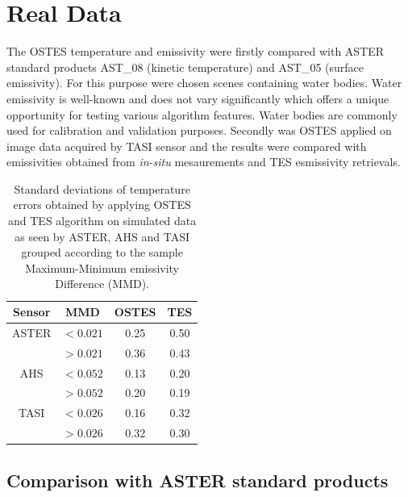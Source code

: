 \section{Real Data}

The OSTES temperature and emissivity were firstly compared with ASTER standard products AST\_08 (kinetic temperature) and AST\_05 (surface emissivity). For this purpose were chosen scenes containing water bodies. Water emissivity is well-known and does not vary significantly which offers a unique opportunity for testing various algorithm features. Water bodies are commonly used for calibration \cite{TP05-2,T05} and validation \cite{TP05} \cite{TP01} purposes. Secondly was OSTES applied on image data acquired by TASI sensor and the results were compared with emissivities obtained from \textit{in-situ} mesaurements and TES esmissivity retrievals. 

\begin{table}[!t]
\vspace{0.5em}
\footnotesize
\centering
\begin{tabular}{cccc}
\toprule
Sensor & MMD & OSTES & TES \\ \hline
ASTER 	& $< 0.021$ & 0.25 & 0.50 \\
 		& $> 0.021$ & 0.36 & 0.43 \\ \hline
AHS 		& $< 0.052$ & 0.13 & 0.20 \\
 		& $> 0.052$ & 0.20 & 0.19 \\ \hline
TASI 	& $< 0.026$ & 0.16 & 0.32 \\
 		& $> 0.026$ & 0.32 & 0.30 \\
\bottomrule
\end{tabular}
\vspace{1.5 em}
\caption{Standard deviations of temperature errors obtained by applying OSTES and TES algorithm on simulated data as seen by ASTER, AHS and TASI grouped according to the sample Maximum-Minimum emissivity Difference (MMD). }
\label{table:StandardDeviations}
\normalsize
\end{table}

\subsection*{Comparison with ASTER standard products}

